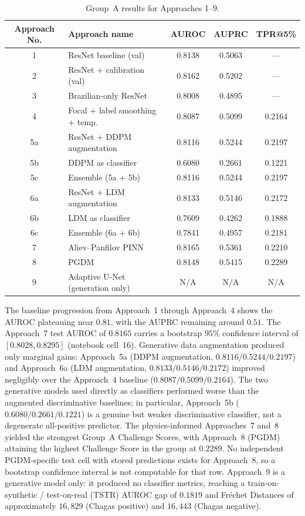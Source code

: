 \begin{table}[htbp]
\centering
\caption{Group~A results for Approaches 1--9.}
\label{tab:groupA}
\begin{tabular}{c l c c c}
\hline
\textbf{Approach No.} & \textbf{Approach name} & \textbf{AUROC} & \textbf{AUPRC} & \textbf{TPR@5\%} \\
\hline
1   & ResNet baseline (val)            & 0.8138 & 0.5063 & --- \\
2   & ResNet + calibration (val)       & 0.8162 & 0.5202 & --- \\
3   & Brazilian-only ResNet            & 0.8008 & 0.4895 & --- \\
4   & Focal + label smoothing + temp.  & 0.8087 & 0.5099 & 0.2164 \\
5a  & ResNet + DDPM augmentation       & 0.8116 & 0.5244 & 0.2197 \\
5b  & DDPM as classifier               & 0.6080 & 0.2661 & 0.1221 \\
5c  & Ensemble (5a + 5b)               & 0.8116 & 0.5244 & 0.2197 \\
6a  & ResNet + LDM augmentation        & 0.8133 & 0.5146 & 0.2172 \\
6b  & LDM as classifier                & 0.7609 & 0.4262 & 0.1888 \\
6c  & Ensemble (6a + 6b)               & 0.7841 & 0.4957 & 0.2181 \\
7   & Aliev--Panfilov PINN             & 0.8165 & 0.5361 & 0.2210 \\
8   & PGDM                             & 0.8148 & 0.5415 & 0.2289 \\
9   & Adaptive U-Net (generation only) & N/A    & N/A    & N/A    \\
\hline
\end{tabular}
\end{table}

The baseline progression from Approach~1 through Approach~4 shows the AUROC
plateauing near $0.81$, with the AUPRC remaining around $0.51$. The Approach~7
test AUROC of $0.8165$ carries a bootstrap $95\%$ confidence interval of
$[0.8028, 0.8295]$ (notebook cell~16). Generative data augmentation produced
only marginal gains: Approach~5a (DDPM augmentation, $0.8116/0.5244/0.2197$) and
Approach~6a (LDM augmentation, $0.8133/0.5146/0.2172$) improved negligibly over
the Approach~4 baseline ($0.8087/0.5099/0.2164$). The two generative models
used directly as classifiers performed worse than the augmented discriminative
baselines; in particular, Approach~5b ($0.6080/0.2661/0.1221$) is a genuine but
weaker discriminative classifier, not a degenerate all-positive predictor. The
physics-informed Approaches~7 and~8 yielded the strongest Group~A Challenge
Scores, with Approach~8 (PGDM) attaining the highest Challenge Score in the
group at $0.2289$. No independent PGDM-specific test cell with stored
predictions exists for Approach~8, so a bootstrap confidence interval is not
computable for that row. Approach~9 is a generative model only: it produced no
classifier metrics, reaching a train-on-synthetic / test-on-real (TSTR) AUROC
gap of $0.1819$ and Fr\'echet Distances of approximately $16{,}829$ (Chagas
positive) and $16{,}443$ (Chagas negative).

